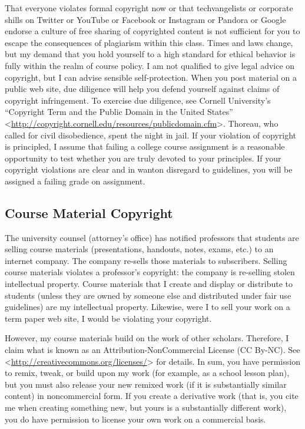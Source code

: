 \documentclass[]{article}
\begin{document}
That everyone violates formal copyright now or that techvangelists or
corporate shills on Twitter or YouTube or Facebook or Instagram or
Pandora or Google endorse a culture of free sharing of copyrighted
content is not sufficient for you to escape the consequences of
plagiarism within this class. Times and laws change, but my demand that
you hold yourself to a high standard for ethical behavior is fully
within the realm of course policy. I am not qualified to give legal
advice on copyright, but I can advise sensible self-protection. When you
post material on a public web site, due diligence will help you defend
yourself against claims of copyright infringement. To exercise due
diligence, see Cornell University's ``Copyright Term and the Public
Domain in the United States''
\textless{}\url{http://copyright.cornell.edu/resources/publicdomain.cfm}\textgreater{}.
Thoreau, who called for civil disobedience, spent the night in jail. If
your violation of copyright is principled, I assume that failing a
college course assignment is a reasonable opportunity to test whether
you are truly devoted to your principles. If your copyright violations
are clear and in wanton disregard to guidelines, you will be assigned a
failing grade on assignment.

\subsection{Course Material Copyright}\label{course-material-copyright}

The university counsel (attorney's office) has notified professors that
students are selling course materials (presentations, handouts, notes,
exams, etc.) to an internet company. The company re-sells those
materials to subscribers. Selling course materials violates a
professor's copyright: the company is re-selling stolen intellectual
property. Course materials that I create and display or distribute to
students (unless they are owned by someone else and distributed under
fair use guidelines) are my intellectual property. Likewise, were I to
sell your work on a term paper web site, I would be violating your
copyright.

However, my course materials build on the work of other scholars.
Therefore, I claim what is known as an Attribution-NonCommercial License
(CC By-NC). See
\textless{}\url{http://creativecommons.org/licenses/}\textgreater{} for
details. In sum, you have permission to remix, tweak, or build upon my
work (for example, as a school lesson plan), but you must also release
your new remixed work (if it is substantially similar content) in
noncommercial form. If you create a derivative work (that is, you cite
me when creating something new, but yours is a substantially different
work), you do have permission to license your own work on a commercial
basis.
\end{document}
